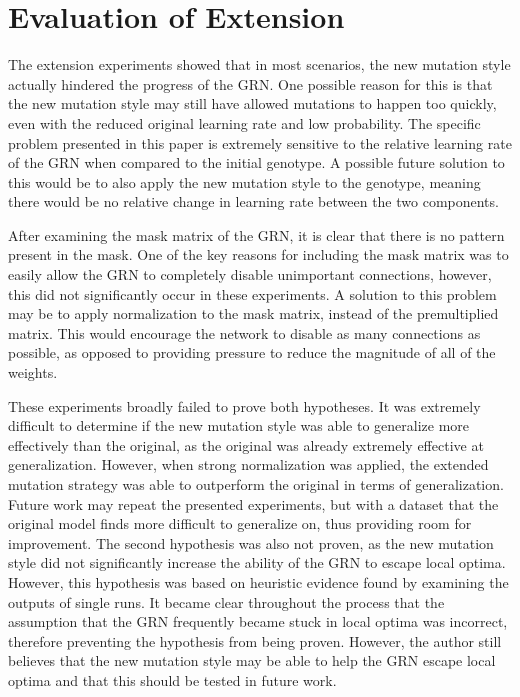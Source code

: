 \documentclass[twocolumn,a4paper,11pt]{article}
\begin{document}
    \section{Evaluation of Extension}
    The extension experiments showed that in most scenarios, the new mutation style actually hindered the progress of the GRN. One possible reason for this is that the new mutation style may still have allowed mutations to happen too quickly, even with the reduced original learning rate and low probability. The specific problem presented in this paper is extremely sensitive to the relative learning rate of the GRN when compared to the initial genotype. A possible future solution to this would be to also apply the new mutation style to the genotype, meaning there would be no relative change in learning rate between the two components.
    
    After examining the mask matrix of the GRN, it is clear that there is no pattern present in the mask. One of the key reasons for including the mask matrix was to easily allow the GRN to completely disable unimportant connections, however, this did not significantly occur in these experiments. A solution to this problem may be to apply normalization to the mask matrix, instead of the premultiplied matrix. This would encourage the network to disable as many connections as possible, as opposed to providing pressure to reduce the magnitude of all of the weights.

    These experiments broadly failed to prove both hypotheses. It was extremely difficult to determine if the new mutation style was able to generalize more effectively than the original, as the original was already extremely effective at generalization. However, when strong normalization was applied, the extended mutation strategy was able to outperform the original in terms of generalization. Future work may repeat the presented experiments, but with a dataset that the original model finds more difficult to generalize on, thus providing room for improvement. The second hypothesis was also not proven, as the new mutation style did not significantly increase the ability of the GRN to escape local optima. However, this hypothesis was based on heuristic evidence found by examining the outputs of single runs. It became clear throughout the process that the assumption that the GRN frequently became stuck in local optima was incorrect, therefore preventing the hypothesis from being proven. However, the author still believes that the new mutation style may be able to help the GRN escape local optima and that this should be tested in future work.
    
\end{document}
